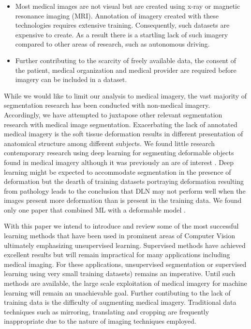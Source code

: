 \documentclass[letterpaper, 10 pt, conference]{ieeeconf}  %
\begin{document}
\begin{itemize}
    \item Most medical images are not visual but are created using x-ray or magnetic resonance imaging (MRI). Annotation of imagery created with these technologies requires extensive training. Consequently, such datasets are expensive to create.  As a result there is a startling lack of such imagery compared to other areas of research, such as autonomous driving.
    \item Further contributing to the scarcity of freely available data, the consent of the patient, medical organization and medical provider are required before imagery can be included in a dataset.
\end{itemize}
 
While we would like to limit our analysis to medical imagery, the vast majority of segmentation research has been conducted with non-medical imagery. Accordingly, we have attempted to juxtapose other relevant segmentation research with medical image segmentation. Exacerbating the lack of annotated medical imagery is the soft tissue deformation results in different presentation of anatomical structure among different subjects. We found little research contemporary research using deep learning for segmenting deformable objects found in medical imagery although it was previously an are of interest \cite{mcinerney1996deformable} \cite{yangdeformable20043d}. Deep learning might be expected to accommodate segmentation in the presence of deformation but the dearth of training datasets portraying deformation resulting from pathology leads to the conclusion that DLN may not perform well when the images present more deformation than is present in the training data. We found only one paper that combined ML with a deformable model \cite{avendi_combined_2016}. 

With this paper we intend to introduce and review some of the most successful learning methods that have been used in prominent areas of Computer Vision ultimately emphasizing unsupervised learning. Supervised methods have achieved excellent results but will remain impractical for many applications including medical imaging. For these applications, unsupervised segmentation or supervised learning using very small training datasets) remains an imperative. Until such methods are available, the large scale exploitation of medical imagery for machine learning will remain an unachievable goal. Further contibuting to the lack of training data is the difficulty of augmenting medical imagery. Traditional data techniques such as mirroring, translating and cropping are frequently inappropriate due to the nature of imaging techniques employed.
\end{document}

